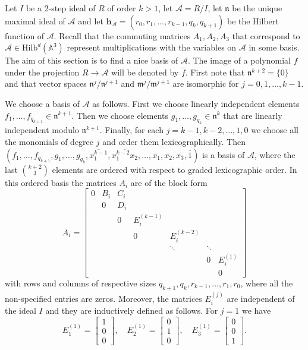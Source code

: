 \documentclass[11pt]{amsart}
\theoremstyle{definition}
\newcommand{\A}{\mathbb{A}}
\newcommand{\m}{\mathfrak{m}}
\newcommand{\Hilb}[2]{\mathrm{Hilb}^{#1}(\A^{#2})}
\newcommand{\h}{\mathbf{h}}
\newcommand{\cA}{\mathcal{A}}
\begin{document}
Let $I$ be a 2-step ideal of $R$ of order $k>1$, let $\cA=R/I$, let $\mathfrak{n}$ be the unique maximal ideal of $\cA$ and let $\h_\cA=(r_0,r_1,\ldots ,r_{k-1},q_k,q_{k+1})$ be the Hilbert function of $\cA$. Recall that the commuting matrices $A_1,A_2,A_3$ that correspond to $\cA\in \Hilb{d}{3}$ represent multiplications with the variables on $\cA$ in some basis. The aim of this section is to find a nice basis of $\cA$. The image of a polynomial $f$ under the projection $R\to \cA$ will be denoted by $\overline{f}$. First note that $\mathfrak{n}^{k+2}=\{0\}$ and that vector spaces $\mathfrak{n}^j/\mathfrak{n}^{j+1}$ and $\m^j/\m^{j+1}$ are isomorphic for $j=0,1,\ldots ,k-1$.

We choose a basis of $\cA$ as follows. First we choose linearly independent elements $f_1,\ldots ,f_{q_{k+1}}\in \mathfrak{n}^{k+1}$. Then we choose elements $g_1,\ldots ,g_{q_k}\in \mathfrak{n}^k$ that are linearly independent modulo $\mathfrak{n}^{k+1}$. Finally, for each $j=k-1,k-2,\ldots ,1,0$ we choose all the monomials of degree $j$ and order them lexicographically. Then $(f_1,\ldots ,f_{q_{k+1}},g_1,\ldots ,g_{q_k},\overline{x_1^{k-1}},\overline{x_1^{k-2}x_2},\ldots ,\overline{x_1},\overline{x_2},\overline{x_3},\overline{1})$ is a basis of $\cA$, where the last ${k+2\choose 3}$ elements are ordered with respect to graded lexicographic order. In this ordered basis the matrices $A_i$ are of the block form
\begin{equation}\label{eq: matrices A_i}
A_i=
\begin{bmatrix}
0 & B_i & C_i\\
& 0 & D_i\\
& & 0 & E_i^{(k-1)}\\
& & & \! \! \! \! \! \! \! 0 & E_i^{(k-2)}\\
& & & & \!\!\!\!\!\!\!\!\ddots & \ddots\\
& & & & & 0 & E_i^{(1)}\\
& & & & & & 0
\end{bmatrix}
\end{equation}
with rows and columns of respective sizes $q_{k+1},q_k,r_{k-1},\ldots ,r_1,r_0$, where all the non-specified entries are zeros. Moreover, the matrices $E_i^{(j)}$ are independent of the ideal $I$ and they are inductively defined as follows. For $j=1$ we have
$$E_1^{(1)}=\begin{bmatrix}1 \\ 0 \\ 0\end{bmatrix}, \quad 
E_2^{(1)}=\begin{bmatrix}0 \\ 1 \\ 0\end{bmatrix}, \quad
E_3^{(1)}=\begin{bmatrix}0 \\ 0 \\ 1\end{bmatrix}.$$
\end{document}
